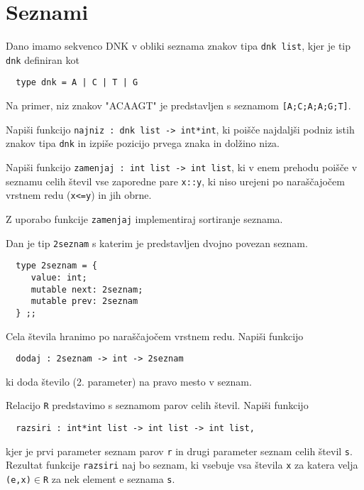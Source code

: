 \section{Seznami}

\begin{ex}
  Dano imamo sekvenco DNK v obliki seznama znakov tipa \texttt{dnk list},
  kjer je tip \texttt{dnk} definiran kot

  \begin{verbatim}
  type dnk = A | C | T | G
  \end{verbatim}
 
  Na primer, niz znakov "ACAAGT" je predstavljen s seznamom 
  \texttt{[A;C;A;A;G;T]}. 

  Napi\v si funkcijo \texttt{najniz : dnk list -> int*int}, ki poi\v s\v
  ce najdalj\v si podniz istih znakov tipa \texttt{dnk} in izpiše 
  pozicijo prvega znaka in dol\v zino niza. 


\end{ex} 
\begin{ex}
  Napi\v si funkcijo \texttt{zamenjaj : int list -> int list}, ki v
  enem prehodu poi\v s\v ce v seznamu celih \v stevil vse zaporedne
  pare \texttt{x::y}, ki niso urejeni po nara\v s\v cajo\v cem vrstnem
  redu (\texttt{x<=y}) in jih obrne.

  Z uporabo funkcije \texttt{zamenjaj} implementiraj sortiranje seznama.


\end{ex} 
\begin{ex}
  Dan je tip \texttt{2seznam} s katerim je predstavljen dvojno povezan
  seznam.

  \begin{verbatim}
  type 2seznam = {
     value: int;
     mutable next: 2seznam;
     mutable prev: 2seznam
  } ;;
  \end{verbatim}

  Cela \v stevila hranimo po nara\v s\v cajo\v cem vrstnem
  redu. Napi\v si funkcijo

  \begin{verbatim}
  dodaj : 2seznam -> int -> 2seznam
  \end{verbatim}

  ki doda \v stevilo (2. parameter) na pravo mesto v seznam.



\end{ex} 
\begin{ex}
  Relacijo \texttt{R} predstavimo s seznamom parov celih \v
  stevil. Napi\v si funkcijo

  \begin{verbatim}
  razsiri : int*int list -> int list -> int list,
  \end{verbatim}

  kjer je prvi parameter seznam parov \texttt{r} in drugi parameter
  seznam celih \v stevil \texttt{s}. Rezultat funkcije
  \texttt{razsiri} naj bo seznam, ki vsebuje vsa \v stevila \texttt{x}
  za katera velja \texttt{(e,x)}$\in$\texttt{R} za nek element e
  seznama \texttt{s}.


\end{ex} 

